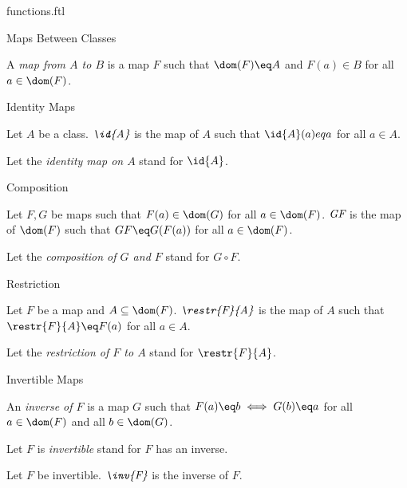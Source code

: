 \documentclass{naproche-library}
\begin{document}
\begin{smodule}[title=Functions and Maps]{functions.ftl}
\begin{sfragment}{Maps Between Classes}
  \begin{definition}[forthel,id=MapFromToDef]
    A \emph{map from $A$ to $B$} is a map $F$ such that $\dom(F)\eq A$ and $F(a)\in B$ for all $a\in\dom(F)$.
  \end{definition}
\end{sfragment}

\begin{sfragment}{Identity Maps}
  \begin{definition}[forthel,id=IdentityMapDef]
    Let $A$ be a class.
    $\emph{\id{A}}$ is the map of $A$ such that $\id{A}(a)eq a$ for all $a\in A$.

    Let the \emph{identity map on $A$} stand for $\id{A}$.
  \end{definition}
\end{sfragment}

\begin{sfragment}{Composition}
  \begin{definition}[forthel,id=CompositionDef]
    Let $F,G$ be maps such that $F(a)\in\dom(G)$ for all $a\in\dom(F)$.
    $\emph{G\circ F}$ is the map of $\dom(F)$ such that $G\circ F\eq G(F(a))$ for all $a\in\dom(F)$.

    Let the \emph{composition of $G$ and $F$} stand for $G\circ F$.
  \end{definition}
\end{sfragment}

\begin{sfragment}{Restriction}
  \begin{definition}[forthel,id=RestrictionDef]
    Let $F$ be a map and $A\subseteq\dom(F)$.
    $\emph{\restr{F}{A}}$ is the map of $A$ such that $\restr{F}{A}\eq F(a)$ for all $a\in A$.

    Let the \emph{restriction of $F$ to $A$} stand for $\restr{F}{A}$.
  \end{definition}
\end{sfragment}

\begin{sfragment}{Invertible Maps}
  \begin{definition}[forthel,id=InvertibleDef]
    An \emph{inverse of $F$} is a map $G$ such that $F(a)\eq b\iff G(b)\eq a$ for all $a\in\dom(F)$ and all $b\in\dom(G)$.

    Let $F$ is \emph{invertible} stand for $F$ has an inverse.
  \end{definition}

  \begin{definition}[forthel,id=InverseMapDef]
    Let $F$ be invertible.
    $\emph{\inv{F}}$ is the inverse of $F$.
  \end{definition}
\end{sfragment}


\end{smodule}
\end{document}

